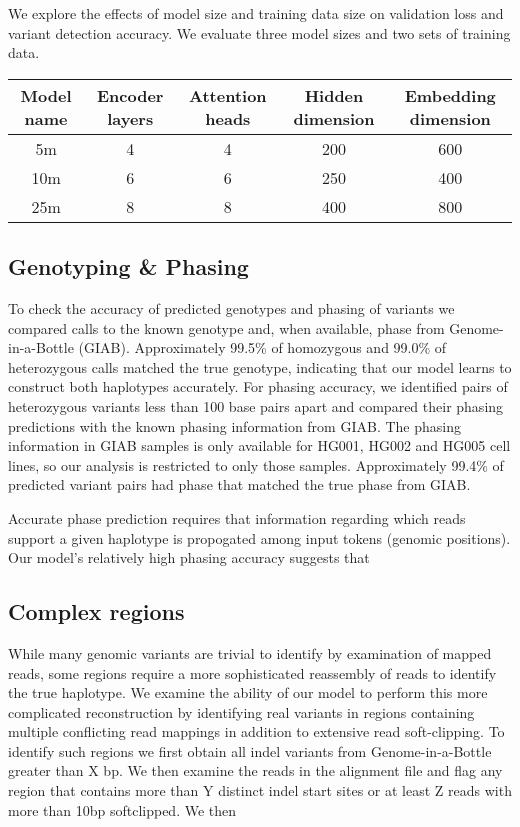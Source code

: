 \documentclass[]{article}
\begin{document}
We explore the effects of model size and training data size on validation loss and variant detection accuracy. We evaluate three model sizes and two sets of training data.

\begin{center}
	\begin{tabular}{ |c|c|c|c|c| }
	 Model name & Encoder layers & Attention heads & Hidden dimension & Embedding dimension \\ 
	\hline
	 5m & 4 & 4 & 200 & 600 \\ 
	 10m & 6 & 6 & 250 & 400 \\ 
	 25m & 8 & 8 & 400 & 800 \\ 
	 \hline
	\end{tabular}
\end{center}



\subsection{Genotyping \& Phasing}

To check the accuracy of predicted genotypes and phasing of variants we compared calls to the known genotype and, when available, phase from Genome-in-a-Bottle (GIAB). Approximately 99.5\% of homozygous  and 99.0\% of heterozygous calls matched the true genotype, indicating that our model learns to construct both haplotypes accurately.  For phasing accuracy, we identified pairs of heterozygous variants less than 100 base pairs apart and compared their phasing predictions with the known phasing information from GIAB. The phasing information in GIAB samples is only available for HG001, HG002 and HG005 cell lines, so our analysis is restricted to only those samples. Approximately 99.4\% of predicted variant pairs had phase that matched the true phase from GIAB. 

Accurate phase prediction requires that information regarding which reads support a given haplotype is propogated among input tokens (genomic positions). Our model's relatively high phasing accuracy suggests that 


\subsection{Complex regions}
 While many genomic variants are trivial to identify by examination of mapped reads, some regions require a more sophisticated reassembly of reads to identify the true haplotype. We examine the ability of our model to perform this more complicated reconstruction by identifying real variants in regions containing multiple conflicting read mappings in addition to extensive read soft-clipping. 
 To identify such regions we first obtain all indel variants from Genome-in-a-Bottle greater than X bp. We then examine the reads in the alignment file and flag any region that contains more than Y distinct indel start sites or at least Z reads with more than 10bp softclipped. We then 
\end{document}
